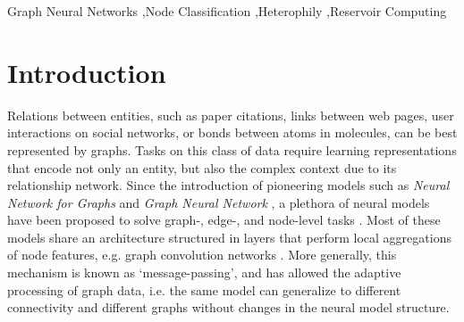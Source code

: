\documentclass[final,5p,times,twocolumn]{elsarticle}
\begin{document}
\begin{frontmatter}
\iffalse
\begin{graphicalabstract}
\texttt{[image: graphical-abstract.pdf]}
\end{graphicalabstract}

\begin{highlights}
\item Extended Graph Echo State Network (GESN) to supervised node classification tasks
\item Improved efficiency/accuracy trade-off on medium- and large-scale heterophilic graphs
\item Reservoirs outside stability constraints can be more effective for node-level tasks
\item GESN allows effective node encoding by message-passing upto the largest shortest path
\end{highlights}
\fi

\begin{keyword}
Graph Neural Networks \sep Node Classification \sep Heterophily \sep Reservoir Computing
\end{keyword}

\end{frontmatter}



\section{Introduction}
\label{sec:intro}

Relations between entities, such as paper citations, links between web pages, user interactions on social networks, or bonds between atoms in molecules, can be best represented by graphs.
Tasks on this class of data require learning representations that encode not only an entity, but also the complex context due to its relationship network.
Since the introduction of pioneering models such as \textsl{Neural Network for Graphs} \citep{Micheli2009} and \textsl{Graph Neural Network} \citep{Scarselli2009}, a plethora of neural models have been proposed to solve graph-, edge-, and node-level tasks \citep{Bacciu2020,Wu2021,Battaglia2018}.
Most of these models share an architecture structured in layers that perform local aggregations of node features, e.g. graph convolution networks \citep{Micheli2009,Duvenaud2015,Atwood2016,Kipf2017}.
More generally, this mechanism is known as `message-passing', and has allowed the adaptive processing of graph data, i.e. the same model can generalize to different connectivity and different graphs without changes in the neural model structure.
\end{document}
